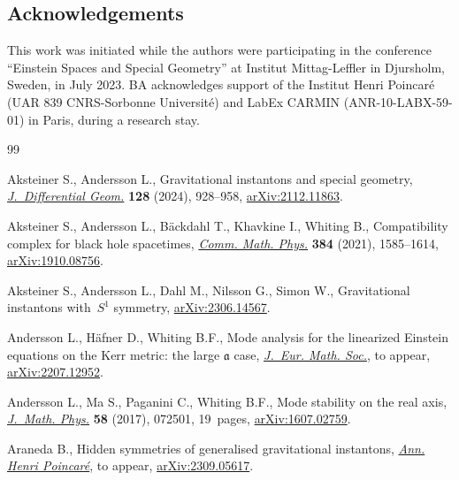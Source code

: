 \documentclass[pdftex]{sigma}
\numberwithin{equation}{section}
\begin{document}
\subsection*{Acknowledgements}

This work was initiated while the authors were participating in the conference ``Einstein Spaces and Special Geometry'' at Institut Mittag-Leffler in Djursholm, Sweden, in July 2023. BA acknowledges support of the Institut Henri Poincar\'e (UAR 839 CNRS-Sorbonne Universit\'e) and LabEx CARMIN (ANR-10-LABX-59-01) in Paris, during a research stay.

\begin{thebibliography}{99}
\footnotesize\itemsep=0pt

Aksteiner S., Andersson L., Gravitational instantons and special geometry,
 \href{https://doi.org/10.4310/jdg/1729092451}{\textit{J.~Differential Geom.}} \textbf{128} (2024), 928--958,
 \href{https://arxiv.org/abs/2112.11863}{arXiv:2112.11863}.

Aksteiner S., Andersson L., B\"ackdahl T., Khavkine I., Whiting B.,
 Compatibility complex for black hole spacetimes, \href{https://doi.org/10.1007/s00220-021-04078-y}{\textit{Comm. Math. Phys.}}
 \textbf{384} (2021), 1585--1614, \href{https://arxiv.org/abs/1910.08756}{arXiv:1910.08756}.

Aksteiner S., Andersson L., Dahl M., Nilsson G., Simon W., Gravitational
 instantons with~{$S^1$} symmetry, \href{https://arxiv.org/abs/2306.14567}{arXiv:2306.14567}.

Andersson L., H\"afner D., Whiting B.F., Mode analysis for the linearized
 {E}instein equations on the {K}err metric: the large $\mathfrak{a}$ case,
 \href{https://doi.org/10.4171/JEMS/1544}{\textit{J.~Eur. Math. Soc.}}, {t}o appear, \href{https://arxiv.org/abs/2207.12952}{arXiv:2207.12952}.

Andersson L., Ma S., Paganini C., Whiting B.F., Mode stability on the real
 axis, \href{https://doi.org/10.1063/1.4991656}{\textit{J.~Math. Phys.}} \textbf{58} (2017), 072501, 19~pages,
 \href{https://arxiv.org/abs/1607.02759}{arXiv:1607.02759}.

Araneda B., Hidden symmetries of generalised gravitational instantons,
 \href{https://doi.org/10.1007/s00023-024-01515-1}{\textit{Ann. Henri Poincar\'e}}, {t}o appear, \href{https://arxiv.org/abs/2309.05617}{arXiv:2309.05617}.


\end{thebibliography}
\end{document}
